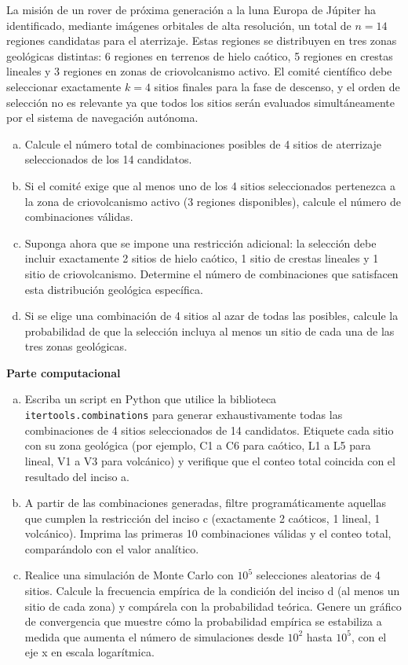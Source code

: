\documentclass[a4paper]{article}
\begin{document}
La misión de un rover de próxima generación a la luna Europa de Júpiter ha identificado, mediante imágenes orbitales de alta resolución, un total de $n = 14$ regiones candidatas para el aterrizaje. Estas regiones se distribuyen en tres zonas geológicas distintas: 6 regiones en terrenos de hielo caótico, 5 regiones en crestas lineales y 3 regiones en zonas de criovolcanismo activo. El comité científico debe seleccionar exactamente $k = 4$ sitios finales para la fase de descenso, y el orden de selección no es relevante ya que todos los sitios serán evaluados simultáneamente por el sistema de navegación autónoma.

\begin{enumerate}[a)]
\item Calcule el número total de combinaciones posibles de 4 sitios de aterrizaje seleccionados de los 14 candidatos.
\item Si el comité exige que al menos uno de los 4 sitios seleccionados pertenezca a la zona de criovolcanismo activo (3 regiones disponibles), calcule  el número de combinaciones válidas.
\item Suponga ahora que se impone una restricción adicional: la selección debe incluir exactamente 2 sitios de hielo caótico, 1 sitio de crestas lineales y 1 sitio de criovolcanismo. Determine el número de combinaciones que satisfacen esta distribución geológica específica.
\item Si se elige una combinación de 4 sitios al azar de todas las posibles, calcule la probabilidad de que la selección incluya al menos un sitio de cada una de las tres zonas geológicas.
\end{enumerate}

\textbf{Parte computacional}
\begin{enumerate}[a)]
\item Escriba un script en Python que utilice la biblioteca \texttt{itertools.combinations} para generar exhaustivamente todas las combinaciones de 4 sitios seleccionados de 14 candidatos. Etiquete cada sitio con su zona geológica (por ejemplo, C1 a C6 para caótico, L1 a L5 para lineal, V1 a V3 para volcánico) y verifique que el conteo total coincida con el resultado del inciso a.
\item A partir de las combinaciones generadas, filtre programáticamente aquellas que cumplen la restricción del inciso c (exactamente 2 caóticos, 1 lineal, 1 volcánico). Imprima las primeras 10 combinaciones válidas y el conteo total, comparándolo con el valor analítico.
\item Realice una simulación de Monte Carlo con $10^5$ selecciones aleatorias de 4 sitios. Calcule la frecuencia empírica de la condición del inciso d (al menos un sitio de cada zona) y compárela con la probabilidad teórica. Genere un gráfico de convergencia que muestre cómo la probabilidad empírica se estabiliza a medida que aumenta el número de simulaciones desde $10^2$ hasta $10^5$, con el eje x en escala logarítmica.
\end{enumerate}
\end{document}
